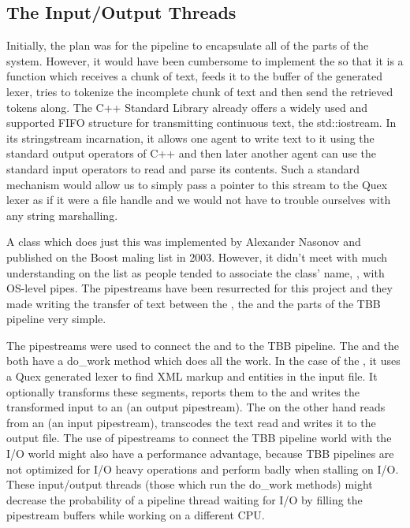 \subsection{The Input/Output Threads}
\label{ssec:impl-parallel-io}

Initially, the plan was for the pipeline to encapsulate all of the parts of the
system. However, it would have been cumbersome to implement the
 so that it is a function which receives a chunk of text,
feeds it to the buffer of the generated lexer, tries to tokenize the incomplete
chunk of text and then send the retrieved tokens along. The C++ Standard
Library already offers a widely used and supported FIFO structure for
transmitting continuous text, the std::iostream. In its stringstream
incarnation, it allows one agent to write text to it using the standard output
operators of C++ and then later another agent can use the standard input
operators to read and parse its contents. Such a standard mechanism would allow
us to simply pass a pointer to this stream to the Quex lexer as if it were a
file handle and we would not have to trouble ourselves with any string
marshalling.

A class which does just this was implemented by Alexander Nasonov and
published on the Boost maling list in 2003. However, it didn't meet with much
understanding on the list as people tended to associate the class' name,
, with OS-level pipes. The pipestreams have been resurrected for
this project and they made writing the transfer of text between the
, the  and the parts of the TBB pipeline
very simple.

The pipestreams were used to connect the  and
 to the TBB pipeline. The  and the
 both have a do\_\-work method which does all the work. In the
case of the , it uses a Quex generated lexer to find XML
markup and entities in the input file. It optionally transforms these
segments, reports them to the  and writes the
transformed input to an  (an output pipestream). The
 on the other hand reads from an  (an input
pipestream), transcodes the text read and writes it to the output file. The
use of pipestreams to connect the TBB pipeline world with the I/O world might
also have a performance advantage, because TBB pipelines are not optimized for
I/O heavy operations and perform badly when stalling on I/O. These
input/output threads (those which run the do\_\-work methods) might decrease
the probability of a pipeline thread waiting for I/O by filling the pipestream
buffers while working on a different CPU.
